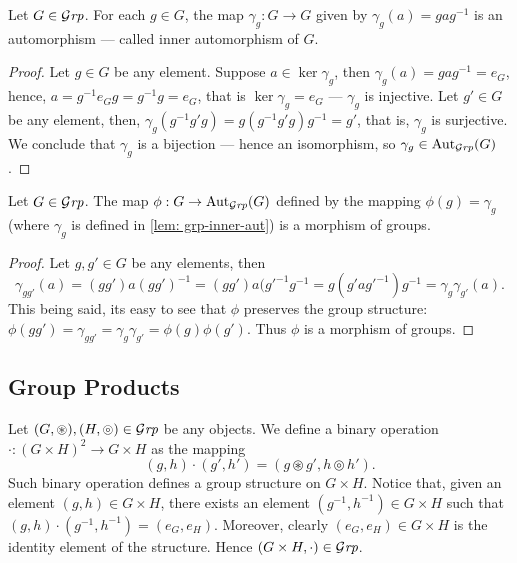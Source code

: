 \begin{lemma}\label{lem: grp-inner-aut}
  Let \(G \in {\mathcal{G}\textit{rp}}\). For each \(g \in G\), the map \(\gamma_g: G \to G\) given
  by \(\gamma_g(a) = gag^{-1}\) is an automorphism --- called inner
  automorphism of \(G\).
\end{lemma}

\begin{proof}
  Let \(g \in G\) be any element. Suppose \(a \in \ker\gamma_g\), then
  \(\gamma_g(a) = gag^{-1} = e_G\), hence, \(a = g^{-1} e_G g = g^{-1}g = e_G\),
  that is \(\ker\gamma_g = e_G\) --- \(\gamma_g\) is injective. Let \(g' \in G\)
  be any element, then, \(\gamma_g(g^{-1} g' g) = g (g^{-1} g' g) g^{-1} = g'\),
  that is, \(\gamma_g\) is surjective. We conclude that \(\gamma_g\) is a
  bijection --- hence an isomorphism, so \(\gamma_g \in \operatorname{Aut}_{\mathcal{G}\textit{rp}}(G)\).
\end{proof}

\begin{lemma}
  \label{lem: grp-inner-aut-cor}
  Let \(G \in {\mathcal{G}\textit{rp}}\). The map \(\phi: G \to \operatorname{Aut}_{\mathcal{G}\textit{rp}}(G)\) defined by the
  mapping \(\phi(g) = \gamma_g\) (where \(\gamma_g\) is defined in \cref{lem:
  grp-inner-aut}) is a morphism of groups.
\end{lemma}

\begin{proof}
  Let \(g, g' \in G\) be any elements, then
  \[
    \gamma_{gg'}(a) = (gg')a(gg')^{-1} = (g g') a (g'^{-1} g^{-1}
    = g(g' a g'^{-1}) g^{-1} = \gamma_g \gamma_{g'}(a).
  \]
  This being said, its easy to see that \(\phi\) preserves the group structure:
  \(\phi(gg') = \gamma_{gg'} = \gamma_g \gamma_{g'} = \phi(g) \phi(g')\). Thus
  \(\phi\) is a morphism of groups.
\end{proof}

\subsection{Group Products}

Let \((G, \circledast), (H, \circledcirc) \in {\mathcal{G}\textit{rp}}\) be any objects. We define a
binary operation \(\cdot: (G \times H)^2 \to G \times H\) as the mapping
\begin{equation}\label{eq: grp-prod-bin}
  (g, h) \cdot (g', h') = (g \circledast g', h \circledcirc h').
\end{equation}
Such binary operation defines a group structure on \(G \times H\). Notice that,
given an element \((g, h) \in G \times H\), there exists an element \((g^{-1},
h^{-1}) \in G \times H\) such that \((g, h) \cdot (g^{-1}, h^{-1}) = (e_G,
e_H)\). Moreover, clearly \((e_G, e_H) \in G \times H\) is the identity element
of the structure. Hence \((G \times H, \cdot) \in {\mathcal{G}\textit{rp}}\).

